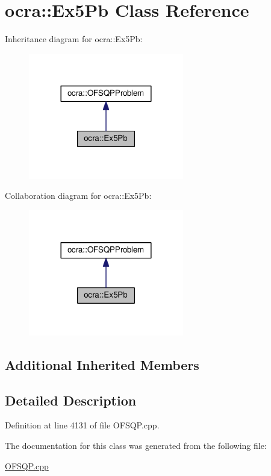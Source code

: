 \hypertarget{classocra_1_1Ex5Pb}{}\section{ocra\+:\+:Ex5\+Pb Class Reference}
\label{classocra_1_1Ex5Pb}


Inheritance diagram for ocra\+:\+:Ex5\+Pb\+:
\nopagebreak
\begin{figure}[H]
\begin{center}
\leavevmode
\includegraphics[width=192pt]{d9/d23/classocra_1_1Ex5Pb__inherit__graph}
\end{center}
\end{figure}


Collaboration diagram for ocra\+:\+:Ex5\+Pb\+:
\nopagebreak
\begin{figure}[H]
\begin{center}
\leavevmode
\includegraphics[width=192pt]{d1/dc8/classocra_1_1Ex5Pb__coll__graph}
\end{center}
\end{figure}
\subsection*{Additional Inherited Members}


\subsection{Detailed Description}


Definition at line 4131 of file O\+F\+S\+Q\+P.\+cpp.



The documentation for this class was generated from the following file\+:\begin{DoxyCompactItemize}
\item 
\hyperlink{OFSQP_8cpp}{O\+F\+S\+Q\+P.\+cpp}\end{DoxyCompactItemize}
